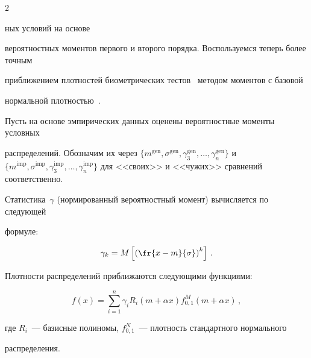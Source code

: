 \begin{multicols}{2}





\noindent


ных условий на основе 


вероятностных моментов первого и второго порядка. Воспользуемся теперь более точным 


приближением плотностей био\-мет\-ри\-че\-ских тестов~\cite{8ar} методом моментов с базовой 


нормальной плотностью~\cite{9ar}. 


  


  Пусть на основе эмпирических данных оценены вероятностные моменты условных 


распределений. Обозначим их через $\{m^{\mathrm{gen}}, \sigma^{\mathrm{gen}}, \gamma_3^{\mathrm{gen}}, \ldots , 


\gamma_n^{\mathrm{gen}}\}$  и $\{m^{\mathrm{imp}}, \sigma^{\mathrm{imp}}, \gamma_3^{\mathrm{imp}}, \ldots , 


\gamma_n^{\mathrm{imp}}\}$ для <<своих>> и <<чужих>> сравнений соответственно. 


Статистика~$\gamma$ (нормированный вероятностный момент) вычисляется по следующей 


формуле:


  \begin{equation*}


  \gamma_k =M\left [ \left (\fr{x-m}{\sigma}\right )^k\right]\,.




  \end{equation*}


  


  Плотности распределений приближаются следующими функциями:


  \begin{equation*}


  f(x) =\sum\limits_{i=1}^n \gamma_i R_i\left (m+\alpha x\right) f^M_{0,1}\left (m+\alpha x\right )\,,




  \end{equation*}


где $R_i$~--- базисные полиномы,  $f_{0,1}^N$~--- плотность стандартного нормального 


распределения.






\end{multicols}

